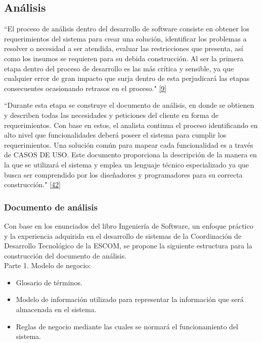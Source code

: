 \subsection{Análisis}

``El proceso de análisis dentro del desarrollo de software consiste en obtener los requerimientos del sistema para crear una solución, identificar los problemas a resolver o necesidad a ser atendida, evaluar las restricciones que presenta, así como los insumos se requieren para su debida construcción.
Al ser la primera etapa dentro del proceso de desarrollo es las más crítica y sensible, ya que cualquier error de gran impacto que surja dentro de esta perjudicará las etapas consecuentes ocasionando retrasos en el proceso." \hyperlink{b09}{[9]} 

\bigskip

``Durante esta etapa se construye el documento de análisis, en donde se obtienen y describen todas las necesidades y peticiones del cliente en forma de requerimientos. Con base en estos, el analista continua el proceso identificando en alto nivel que funcionalidades deberá poseer el sistema para cumplir los requerimientos. Una solución común para mapear cada funcionalidad es a través de CASOS DE USO. Este documento proporciona la descripción de la manera en la que se utilizará el sistema y emplea un lenguaje técnico especializado ya que busca ser comprendido por los diseñadores y programadores para su correcta construcción." \hyperlink{b42}{[42]}


\subsubsection{Documento de análisis}

Con base en los enunciados del libro Ingeniería de Software, un enfoque práctico y la experiencia adquirida en el desarrollo de sistemas de la Coordinación de Desarrollo Tecnológico de la ESCOM, se propone la siguiente estructura para la construcción del documento de análisis.\\

Parte 1. Modelo de negocio:
\begin{itemize}
	\item Glosario de términos.
	\item Modelo de información utilizado para representar la información que será almacenada en el sistema.
	\item Reglas de negocio mediante las cuales se normará el funcionamiento del sistema.
\end{itemize}

